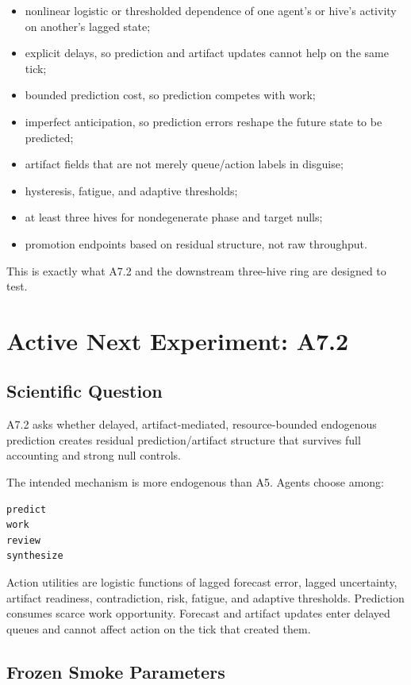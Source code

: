 \documentclass[11pt]{article}
\begin{document}
\begin{itemize}
\item nonlinear logistic or thresholded dependence of one agent's or hive's
activity on another's lagged state;
\item explicit delays, so prediction and artifact updates cannot help on the
same tick;
\item bounded prediction cost, so prediction competes with work;
\item imperfect anticipation, so prediction errors reshape the future state to
be predicted;
\item artifact fields that are not merely queue/action labels in disguise;
\item hysteresis, fatigue, and adaptive thresholds;
\item at least three hives for nondegenerate phase and target nulls;
\item promotion endpoints based on residual structure, not raw throughput.
\end{itemize}

This is exactly what A7.2 and the downstream three-hive ring are designed to
test.

\section{Active Next Experiment: A7.2}

\subsection{Scientific Question}

A7.2 asks whether delayed, artifact-mediated, resource-bounded endogenous
prediction creates residual prediction/artifact structure that survives full
accounting and strong null controls.

The intended mechanism is more endogenous than A5. Agents choose among:

\begin{verbatim}
predict
work
review
synthesize
\end{verbatim}

Action utilities are logistic functions of lagged forecast error, lagged
uncertainty, artifact readiness, contradiction, risk, fatigue, and adaptive
thresholds. Prediction consumes scarce work opportunity. Forecast and artifact
updates enter delayed queues and cannot affect action on the tick that created
them.

\subsection{Frozen Smoke Parameters}
\end{document}
